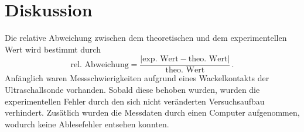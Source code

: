 \section{Diskussion}
\label{sec:Diskussion}
Die relative Abweichung zwischen dem theoretischen und dem experimentellen Wert wird bestimmt durch
$$\text{rel. Abweichung} = \frac{|\text{exp. Wert} - \text{theo. Wert}|}{\text{theo. Wert}}\,.$$
Anfänglich waren Messschwierigkeiten aufgrund eines Wackelkontakts der Ultraschallsonde vorhanden. 
Sobald diese behoben wurden, wurden die experimentellen Fehler durch den sich nicht veränderten Versuchsaufbau
verhindert. Zusätlich wurden die Messdaten durch einen Computer aufgenommen, wodurch keine Ablesefehler entsehen
konnten.  